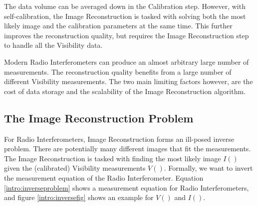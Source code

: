 The data volume can be averaged down in the Calibration step. However, with self-calibration, the Image Reconstruction is tasked with solving both the most likely image and the calibration parameters at the same time. This further improves the reconstruction quality\cite{Wiauxselfcal}, but requires the Image Reconstruction step to handle all the Visibility data.

Modern Radio Interferometers can produce an almost arbitrary large number of measurements. The reconstruction quality benefits from a large number of different Visibility measurements. The two main limiting factors however, are the cost of data storage and the scalability of the Image Reconstruction algorithm.


\subsection{The Image Reconstruction Problem}
For Radio Interferometers, Image Reconstruction forms an ill-posed inverse problem. There are potentially many different images that fit the measurements. The Image Reconstruction is tasked with finding the most likely image $I()$ given the (calibrated) Visibility measurements $V()$. Formally, we want to invert the measurement equation of the Radio Interferometer. Equation \eqref{intro:inverseproblem} shows a measurement equation for Radio Interferometers, and figure \ref{intro:inversefig} shows an example for $V()$ and $I()$.

